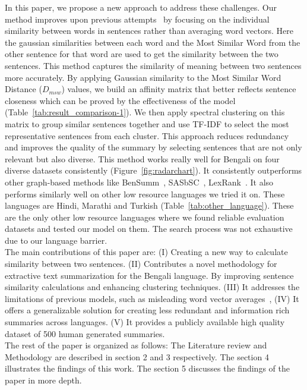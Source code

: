 In this paper, we propose a new approach to address these challenges.
Our method improves upon previous
attempts~\cite{roychowdhury-etal-2022-spectral-base}
by focusing on the individual similarity between words
in sentences rather than averaging word vectors.
Here the gaussian similarities between each word and
the Most Similar Word from the other sentence for that word are
used to get the similarity between the two sentences.
This method captures the similarity of meaning between
two sentences more accurately.
By applying Gaussian similarity to the Most Similar
Word Distance ($D_{msw}$) values, we build an affinity matrix that
better reflects sentence closeness which can be proved
by the effectiveness of the model (Table~\ref{tab:result_comparison-1}).
We then apply spectral clustering on this matrix to
group similar sentences together and use TF-IDF to select the
most representative sentences from each cluster.
This approach reduces redundancy and improves the
quality of the summary by selecting sentences that are not only
relevant but also diverse.
This method works really well for Bengali on four
diverse datasets consistently (Figure~\ref{fig:radarchart}).
It consistently outperforms other graph-based methods
like BenSumm~\cite{chowdhury-etal-2021-tfidf-clustering},
SASbSC~\cite{roychowdhury-etal-2022-spectral-base},
LexRank~\cite{Erkan-lexRank-2004}.
It also performs similarly well on other low resource languages we tried it on.
These languages are Hindi, Marathi and Turkish
(Table~\ref{tab:other_language}).
These are the only other low resource languages
where we found reliable evaluation datasets and tested our model on them.
The search process was not exhaustive due to our language barrier.\\

The main contributions of this paper are:
(I) Creating a new way to calculate similarity
between two sentences.
(II) Contributes a novel methodology for extractive
text summarization for the Bengali language.
By improving sentence similarity calculations and
enhancing clustering techniques.
(III) It addresses the limitations of previous models, such as misleading
word vector averages~\cite{roychowdhury-etal-2022-spectral-base},
(IV) It offers a generalizable solution for creating less
redundant and information rich summaries across languages.
(V) It provides a publicly available high quality dataset
of 500 human generated summaries.\\

The rest of the paper is organized as follows:
The Literature review and Methodology are described in
section 2 and 3 respectively.
The section 4 illustrates the findings of this work.
The section 5 discusses the findings of the paper in more depth.